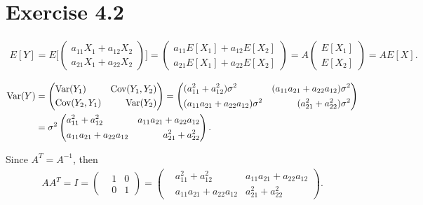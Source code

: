 \section*{Exercise 4.2}
\begin{align*}
    E[Y]=E\bigg[\left(\begin{aligned}
        a_{11}X_1+a_{12}X_2\\
        a_{21}X_1+a_{22}X_2
    \end{aligned}\right)\bigg]=
    \left(\begin{aligned}
        a_{11}E[X_1]+a_{12}E[X_2]\\
        a_{21}E[X_1]+a_{22}E[X_2]
    \end{aligned}\right)=
    A\left(\begin{aligned}
        E[X_1]\\
        E[X_2]
    \end{aligned}\right)=AE[X].
\end{align*}

\begin{align*}
    \text{Var}(Y)&=\left(\begin{aligned}
        &\text{Var}(Y_1) & \text{Cov}(Y_1,Y_2)\\
        &\text{Cov}(Y_2,Y_1) & \text{Var}(Y_2)
    \end{aligned}\right)
    =\left(\begin{aligned}
        &(a_{11}^2+a_{12}^2)\sigma^2 & (a_{11}a_{21}+a_{22}a_{12})\sigma^2\\
        &(a_{11}a_{21}+a_{22}a_{12})\sigma^2 & (a_{21}^2+a_{22}^2)\sigma^2
    \end{aligned}\right)\\
    &=\sigma^2\left(\begin{aligned}
        &a_{11}^2+a_{12}^2 & a_{11}a_{21}+a_{22}a_{12}\\
        &a_{11}a_{21}+a_{22}a_{12} & a_{21}^2+a_{22}^2
    \end{aligned}\right).
\end{align*}

Since $A^T=A^{-1}$, then
\begin{align*}
    AA^T=I=\left(\begin{aligned}&1&0\\&0&1\end{aligned}\right)
        =\left(\begin{aligned}
        &a_{11}^2+a_{12}^2 & a_{11}a_{21}+a_{22}a_{12}\\
        &a_{11}a_{21}+a_{22}a_{12} & a_{21}^2+a_{22}^2
    \end{aligned}\right).
\end{align*}

